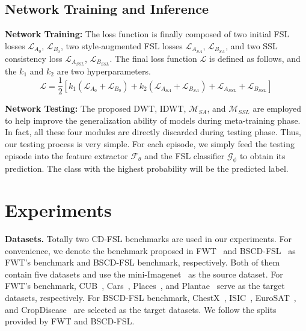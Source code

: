 \documentclass{article}
\begin{document}
	
\subsection{Network Training and Inference}


\noindent\textbf{Network Training:} The loss function is finally composed of two initial FSL losses $\mathcal{L}_{A_{0}}$, $\mathcal{L}_{B_{0}}$, two style-augmented FSL losses $\mathcal{L}_{A_{SA}}$, $\mathcal{L}_{B_{SA}}$, and two SSL consistency loss $\mathcal{L}_{A_{SSL}}$, $\mathcal{L}_{B_{SSL}}$. The final loss function $\mathcal{L}$ is defined as follows, and the $k_1$ and $k_2$ are two hyperparameters. 
\begin{equation}
	\mathcal{L}=\frac{1}{2}	\left[k_{1}(\mathcal{L}_{A_{0}} + \mathcal{L}_{B_{0}}) +k_{2}(\mathcal{L}_{A_{SA}} + \mathcal{L}_{B_{SA}})+ \mathcal{L}_{A_{SSL}} + \mathcal{L}_{B_{SSL}}\right]
	\end{equation}



\noindent \textbf{Network Testing:} The proposed DWT, IDWT, $\mathcal{M}_{SA}$, and $\mathcal{M}_{SSL}$ are employed to help improve the generalization ability of models during meta-training phase. In fact, all these four modules are directly discarded during testing phase. Thus, our testing process is very simple. For each episode, we simply feed the testing episode into the feature extractor $\mathcal{F_{\theta}}$ and the FSL classifier $\mathcal{G_{\phi}}$ to obtain its prediction. The class with the highest probability will be the predicted label.


	
\section{Experiments}
\noindent\textbf{Datasets.} Totally two CD-FSL benchmarks are used in our experiments. For convenience, we denote the benchmark proposed in FWT~\cite{tseng2020cross} and BSCD-FSL~\cite{guo2020broader} as FWT's benchmark and BSCD-FSL benchmark, respectively. Both of them contain five datasets and use the mini-Imagenet~\cite{deng2009imagenet} as the source dataset. For FWT's benchmark, CUB~\cite{wah2011caltech}, Cars~\cite{krause20133d}, Places~\cite{zhou2017places}, and Plantae~\cite{van2018inaturalist} serve as the target datasets, respectively. For BSCD-FSL benchmark, ChestX~\cite{wang2017chestx}, ISIC~\cite{tschandl2018ham10000,codella2019skin}, EuroSAT~\cite{helber2019eurosat}, and CropDisease~\cite{mohanty2016using} are selected as the target datasets. We follow the splits provided by FWT and BSCD-FSL. 
\end{document}
